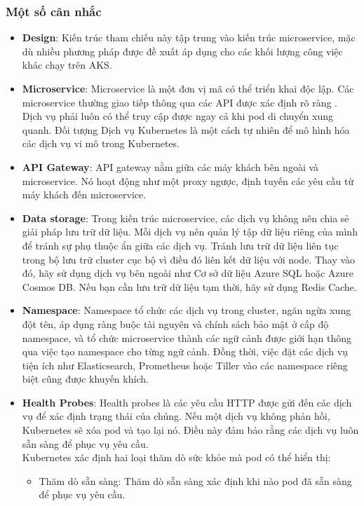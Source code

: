 \subsubsection{Một số cân nhắc}
\begin{itemize}
    \item \textbf{Design}: Kiến trúc tham chiếu này tập trung vào kiến trúc microservice, mặc dù nhiều phương pháp được đề xuất áp dụng cho các khối lượng công việc khác chạy trên AKS.
    \item \textbf{Microservice}: Microservice là một đơn vị mã có thể triển khai độc lập. Các microservice thường giao tiếp thông qua các API được xác định rõ ràng . Dịch vụ phải luôn có thể truy cập được ngay cả khi pod di chuyển xung quanh. Đối tượng Dịch vụ Kubernetes là một cách tự nhiên để mô hình hóa các dịch vụ vi mô trong Kubernetes.
    \item \textbf{API Gateway}: API gateway nằm giữa các máy khách bên ngoài và microservice. Nó hoạt động như một proxy ngược, định tuyến các yêu cầu từ máy khách đến microservice.
    \item \textbf{Data storage}: Trong kiến trúc microservice, các dịch vụ không nên chia sẻ giải pháp lưu trữ dữ liệu. Mỗi dịch vụ nên quản lý tập dữ liệu riêng của mình để tránh sự phụ thuộc ẩn giữa các dịch vụ.
Tránh lưu trữ dữ liệu liên tục trong bộ lưu trữ cluster cục bộ vì điều đó liên kết dữ liệu với node. Thay vào đó, hãy sử dụng dịch vụ bên ngoài như Cơ sở dữ liệu Azure SQL hoặc Azure Cosmos DB. Nếu bạn cần lưu trữ dữ liệu tạm thời, hãy sử dụng Redis Cache.
    \item \textbf{Namespace}: Namespace tổ chức các dịch vụ trong cluster, ngăn ngừa xung đột tên, áp dụng ràng buộc tài nguyên và chính sách bảo mật ở cấp độ namespace, và tổ chức microservice thành các ngữ cảnh được giới hạn thông qua việc tạo namespace cho từng ngữ cảnh. Đồng thời, việc đặt các dịch vụ tiện ích như Elasticsearch, Prometheus hoặc Tiller vào các namespace riêng biệt cũng được khuyến khích.
    \item \textbf{Health Probes}: Health probes là các yêu cầu HTTP được gửi đến các dịch vụ để xác định trạng thái của chúng. Nếu một dịch vụ không phản hồi, Kubernetes sẽ xóa pod và tạo lại nó. Điều này đảm bảo rằng các dịch vụ luôn sẵn sàng để phục vụ yêu cầu.
    \\[0.5cm]
    Kubernetes xác định hai loại thăm dò sức khỏe mà pod có thể hiển thị:
        \begin{itemize}
            \item Thăm dò sẵn sàng: Thăm dò sẵn sàng xác định khi nào pod đã sẵn sàng để phục vụ yêu cầu.  

\end{itemize}
\end{itemize}

